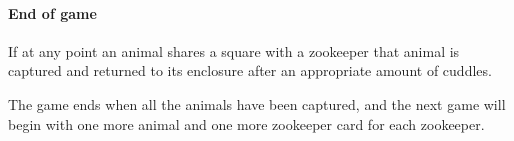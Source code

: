 \documentclass[12pt,twocolumn]{article}
\begin{document}
\paragraph{End of game}
If at any point an animal shares a square with a zookeeper that animal is
captured and returned to its enclosure after an appropriate amount of cuddles.

The game ends when all the animals have been captured, and the next game will
begin with one more animal and one more zookeeper card for each zookeeper.
\end{document}
